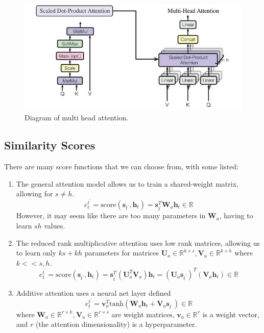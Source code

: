 \documentclass{article}
\begin{document}
    \begin{figure}[H]
      \centering 
      \includegraphics[scale=1.0]{img/10_Attention/multi_head_attention.png}
      \caption{Diagram of multi head attention. } 
      \label{fig:multi_head_attention}
    \end{figure}

  \subsection{Similarity Scores}

    There are many score functions that we can choose from, with some listed: 
    \begin{enumerate}
        \item The general attention model allows us to train a shared-weight matrix, allowing for $s \neq h$. 
        \[e^{t^\prime}_t = \mathrm{score}(\mathbf{s}_{t^\prime}, \mathbf{h}_t) = \mathbf{s}_{t^\prime}^T \mathbf{W}_a \mathbf{h}_t \in \mathbb{R}\]
        However, it may seem like there are too many parameters in $\mathbf{W}_a$, having to learn $sh$ values. 

        \item The reduced rank multiplicative attention uses low rank matrices, allowing us to learn only $ks + kh$ parameters for matrices $\mathbf{U}_a \in \mathbb{R}^{k \times s}, \mathbf{V}_a \in \mathbb{R}^{k \times h}$ where $k << s, h$. 
        \[e^{t^\prime}_t = \mathrm{score}(\mathbf{s}_{t^\prime}, \mathbf{h}_t) = \mathbf{s}_{t^\prime}^T (\mathbf{U}_a^T \mathbf{V}_a) \mathbf{h}_t = (\mathbf{U}_a \mathbf{s}_{t^\prime})^T (\mathbf{V}_a \mathbf{h}_t) \in \mathbb{R}\]

        \item Additive attention uses a neural net layer defined 
        \[e^{t^\prime}_t = \mathbf{v}_a^T \mathrm{tanh}(\mathbf{W}_a \mathbf{h}_t + \mathbf{V}_a \mathbf{s}_{t^\prime}) \in \mathbb{R}\]
        where $\mathbf{W}_a \in \mathbb{R}^{r \times h}, \mathbf{V}_a \in \mathbb{R}^{r \times s}$ are weight matrices, $\mathbf{v}_a \in \mathbb{R}^r$ is a weight vector, and $r$ (the attention dimensionality) is a hyperparameter. 
    \end{enumerate}
\end{document}
